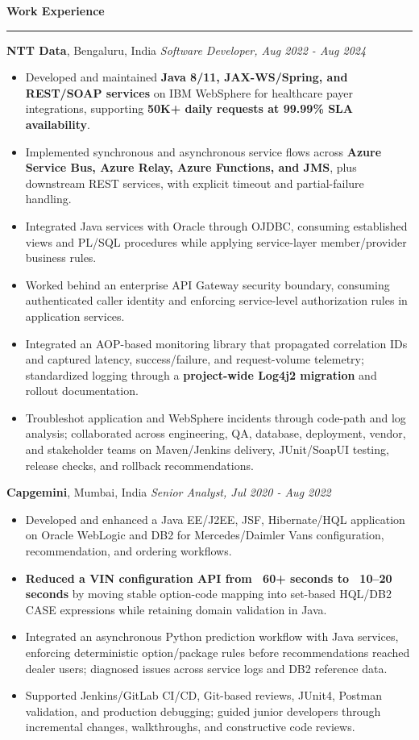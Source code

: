 \documentclass[11pt,letterpaper]{article}
\newcommand{\ressection}[1]{\Needspace{6\baselineskip}\vspace{8pt}\par\textbf{#1}\par\vspace{2pt}\hrule\vspace{5pt}}
\begin{document}
\ressection{Work Experience}
\textbf{NTT Data}, Bengaluru, India \hfill \textit{Software Developer, Aug 2022 - Aug 2024}
\begin{itemize}
  \item Developed and maintained \textbf{Java 8/11, JAX-WS/Spring, and REST/SOAP services} on IBM WebSphere for healthcare payer integrations, supporting \textbf{50K+ daily requests at 99.99\% SLA availability}.
  \item Implemented synchronous and asynchronous service flows across \textbf{Azure Service Bus, Azure Relay, Azure Functions, and JMS}, plus downstream REST services, with explicit timeout and partial-failure handling.
  \item Integrated Java services with Oracle through OJDBC, consuming established views and PL/SQL procedures while applying service-layer member/provider business rules.
  \item Worked behind an enterprise API Gateway security boundary, consuming authenticated caller identity and enforcing service-level authorization rules in application services.
  \item Integrated an AOP-based monitoring library that propagated correlation IDs and captured latency, success/failure, and request-volume telemetry; standardized logging through a \textbf{project-wide Log4j2 migration} and rollout documentation.
  \item Troubleshot application and WebSphere incidents through code-path and log analysis; collaborated across engineering, QA, database, deployment, vendor, and stakeholder teams on Maven/Jenkins delivery, JUnit/SoapUI testing, release checks, and rollback recommendations.
\end{itemize}
\textbf{Capgemini}, Mumbai, India \hfill \textit{Senior Analyst, Jul 2020 - Aug 2022}
\begin{itemize}
  \item Developed and enhanced a Java EE/J2EE, JSF, Hibernate/HQL application on Oracle WebLogic and DB2 for Mercedes/Daimler Vans configuration, recommendation, and ordering workflows.
  \item \textbf{Reduced a VIN configuration API from ~60+ seconds to ~10--20 seconds} by moving stable option-code mapping into set-based HQL/DB2 CASE expressions while retaining domain validation in Java.
  \item Integrated an asynchronous Python prediction workflow with Java services, enforcing deterministic option/package rules before recommendations reached dealer users; diagnosed issues across service logs and DB2 reference data.
  \item Supported Jenkins/GitLab CI/CD, Git-based reviews, JUnit4, Postman validation, and production debugging; guided junior developers through incremental changes, walkthroughs, and constructive code reviews.
\end{itemize}
\end{document}

